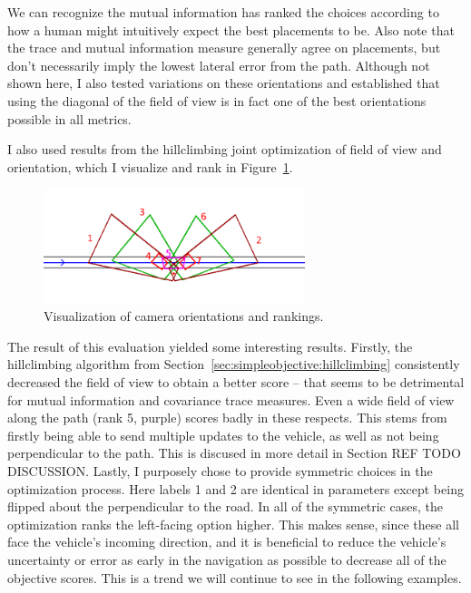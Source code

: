 \documentclass[a4paper,12pt,twoside,openright]{report}
\begin{document}
We can recognize the mutual information has ranked the choices according to how 
a human might intuitively expect the best placements to be. Also note that
the trace and mutual information measure generally agree on placements, but don't
necessarily imply the lowest lateral error from the path. Although not shown here,
I also tested variations on these orientations and established that
using the diagonal of the field of view is in fact one of the best orientations
possible in all metrics.

I also used results from the hillclimbing joint optimization of field of view and
orientation, which I visualize and rank in Figure~\ref{fig:straightroad160multi}.

\begin{figure}[htb]
    \centering
    \includegraphics[width=3in]{figures/straightroad_160m_singlecamera_multifov.png}
    \caption[Single Camera Optimization Using MI]{Visualization of camera orientations and rankings.}
    \label{fig:straightroad160multi}
\end{figure}

The result of this evaluation yielded some interesting results. Firstly, the hillclimbing
algorithm from Section~\ref{sec:simpleobjective:hillclimbing} consistently decreased
the field of view to obtain a better score -- that seems to be detrimental
for mutual information and covariance trace measures. Even a wide field of view
along the path (rank 5, purple) scores badly in these respects. This stems
from firstly being able to send multiple updates to the vehicle, as well as
not being perpendicular to the path. This is discused in more detail
in Section REF TODO DISCUSSION. Lastly, I purposely chose to provide symmetric
choices in the optimization process. Here labels 1 and 2 are identical in
parameters except being flipped about the perpendicular to the road. In all
of the symmetric cases, the optimization ranks the left-facing option higher.
This makes sense, since these all face the vehicle's incoming direction, 
and it is beneficial to reduce the vehicle's uncertainty or error as 
early in the navigation as possible to decrease all of the objective scores.
This is a trend we will continue to see in the following examples.
\end{document}
